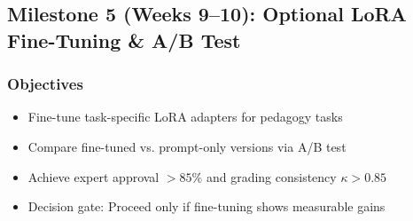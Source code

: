 \documentclass[11pt,letterpaper]{article}
\begin{document}
\subsection{Milestone 5 (Weeks 9--10): Optional LoRA Fine-Tuning \& A/B Test}

\subsubsection{Objectives}
\begin{itemize}
\item Fine-tune task-specific LoRA adapters for pedagogy tasks
\item Compare fine-tuned vs. prompt-only versions via A/B test
\item Achieve expert approval $> 85\%$ and grading consistency $\kappa > 0.85$
\item Decision gate: Proceed only if fine-tuning shows measurable gains
\end{itemize}
\end{document}
